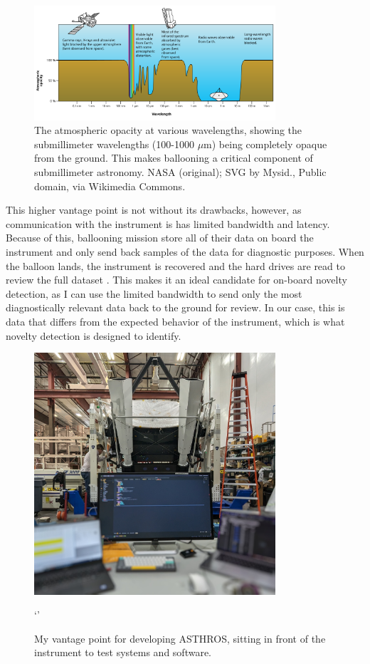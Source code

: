 \begin{figure}
\centering
\includegraphics[width=0.8\textwidth]{figs/intro/atmosphere.png}
\caption[Atmospheric Opacity at Various Wavelengths]{
    The atmospheric opacity at various wavelengths, showing the submillimeter wavelengths (100-1000 $\mu$m) being completely opaque from the ground.
    This makes ballooning a critical component of submillimeter astronomy. NASA (original); SVG by Mysid., Public domain, via Wikimedia Commons.
    \label{intro/fig:atmosphere}
}
\end{figure}

This higher vantage point is not without its drawbacks, however, as communication with the instrument is has limited bandwidth and latency. 
Because of this, ballooning mission store all of their data on board the instrument and only send back samples of the data for diagnostic purposes.
When the balloon lands, the instrument is recovered and the hard drives are read to review the full dataset \parencite{walker_STO}.
This makes it an ideal candidate for on-board novelty detection, as I can use the limited bandwidth to send only the most diagnostically relevant data back to the ground for review.
In our case, this is data that differs from the expected behavior of the instrument, which is what novelty detection is designed to identify.

\begin{figure}
\centering
\includegraphics[width=0.8\textwidth]{figs/intro/asthros_instrument.jpg}
\caption[Command Station for Software Development of ASTHROS]{
    My vantage point for developing ASTHROS, sitting in front of the instrument to test systems and software.
}`'
\label{intro/fig:asthros_instrument}
\end{figure}


